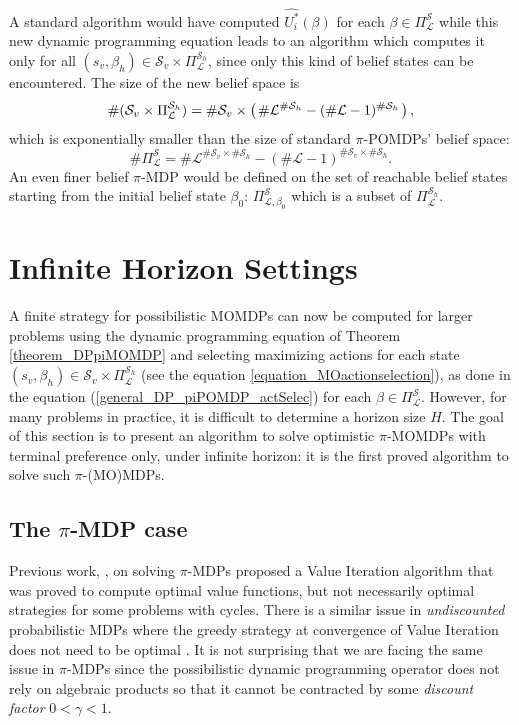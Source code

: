 A standard algorithm would have computed $\widehat{U_i^*}(\beta)$ for each
 $\beta \in \Pi^{\mathcal{S}}_{\mathcal{L}}$ 
while this new dynamic programming equation 
leads to an algorithm 
which computes it only 
for all $(s_v,\beta_h) \in \mathcal{S}_v \times 
\Pi^{\mathcal{S}_h}_{\mathcal{L}}$,
since only this kind of belief states can be encountered. 
The size of the new belief space is 
\[ \# (\mathcal{S}_v \times \Pi^{\mathcal{S}_h}_{\mathcal{L}})
= \# \mathcal{S}_v \times \left( \left.  \# \mathcal{L}^{\# \mathcal{S}_h} - (\# \mathcal{L}-1)^{\# \mathcal{S}_h}  \right. \right), \] 
which is exponentially smaller than the size of standard 
$\pi$-POMDPs' belief space: 
\[ \# \Pi^{\mathcal{S}}_{\mathcal{L}} = \# \mathcal{L}^{\# \mathcal{S}_v \times \# \mathcal{S}_h} - (\# \mathcal{L}-1)^{\# \mathcal{S}_v \times \# \mathcal{S}_h}. \]
An even finer belief $\pi$-MDP 
would be defined on the set of reachable belief states 
starting from the initial belief state $\beta_0$: 
$\Pi^{\mathcal{S}}_{\mathcal{L},\beta_0}$ which is a subset of 
$\Pi^{\mathcal{S}_h}_{\mathcal{L}}$. 

\section{Infinite Horizon Settings}
\label{section_infiniteHorizon}
A finite strategy for possibilistic MOMDPs can now be computed for
larger problems using the dynamic programming equation of Theorem \ref{theorem_DPpiMOMDP} 
and selecting maximizing actions for each state $(s_v,\beta_h) \in \mathcal{S}_v \times \Pi^{\mathcal{S}_h}_{\mathcal{L}}$
(see the equation \ref{equation_MOactionselection}), 
as done in the equation (\ref{general_DP_piPOMDP_actSelec}) 
for each $\beta \in \Pi^{\mathcal{S}}_{\mathcal{L}}$.
However, for many problems in practice, 
it is difficult to determine a horizon size $H$. 
The goal of this section is to present
an algorithm to solve optimistic $\pi$-MOMDPs with terminal preference only,
under infinite horizon:
it is the first proved algorithm to solve such $\pi$-(MO)MDPs.

\subsection{The $\pi$-MDP case}
\label{subsection_piVI}
Previous work, \cite{Sabbadin:1999:pipomdp,Sabbadin2001287}, 
on solving $\pi$-MDPs proposed a Value Iteration
algorithm that was proved to compute optimal value functions, but not
necessarily optimal strategies for some problems with cycles. 
There is a similar issue 
in \emph{undiscounted} probabilistic MDPs 
where the greedy strategy at convergence of Value Iteration 
does not need to be optimal \cite{puterman94}.
It is not surprising that we are facing the same issue in $\pi$-MDPs since the
possibilistic dynamic programming operator does not rely on algebraic products
so that it cannot be contracted by some \textit{discount factor} $0 < \gamma < 1$.

